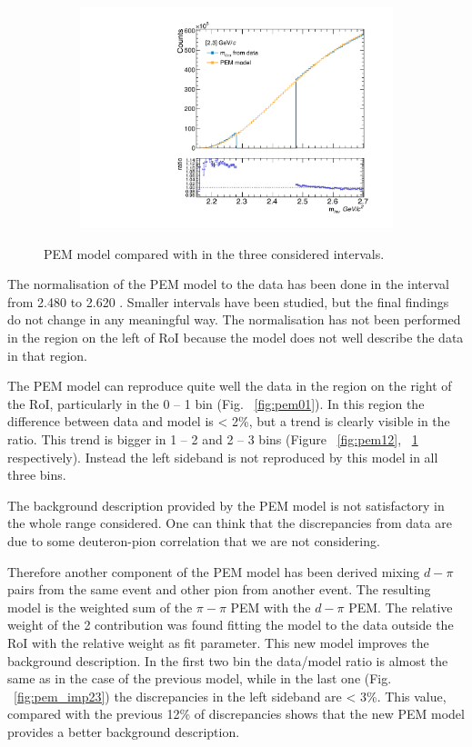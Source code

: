 \begin{figure}
\begin{subfigure}{.33\textwidth}
  \includegraphics[width=\linewidth]{gfx/23}
  \caption{}
  \label{fig:pem23}
\end{subfigure}
\caption{PEM model compared with \minv in the three considered \pt intervals.}
\label{fig:PEM}
\end{figure}

The normalisation of the PEM model to the data has been done in the interval from 2.480 to
2.620 \gevcs. Smaller intervals have been studied, but the final findings do not
change in any meaningful way. The normalisation has not been performed in the region on the left 
of RoI because the model does not well describe the data in that region.

The PEM model can reproduce quite well the data in the region on the right of the RoI,
particularly in the 0 -- 1 \gevc \pt bin (Fig. ~\ref{fig:pem01}). In this region the difference between
data and model is < 2\%, but a trend is clearly visible in the ratio.
This trend is bigger in 1 -- 2 \gevc and 2 -- 3 \gevc \pt bins (Figure ~\ref{fig:pem12}, 
~\ref{fig:pem23} respectively).
Instead the left sideband is not reproduced by this model in all three \pt bins.

The background description provided by the PEM model is not satisfactory in the whole \pt range
considered. One can think that the discrepancies from data are due to some deuteron-pion correlation
that we are not considering.

Therefore another component of the PEM model has been derived mixing $d-\pi$ pairs from the
same event and other pion from another event.
The resulting model is the weighted sum of the $\pi-\pi$ PEM with the $d-\pi$ PEM. 
The relative weight of the 2 contribution was found fitting the model to the data outside the RoI
with the relative weight as fit parameter.
This new model improves the background description.
In the first two \pt bin the data/model ratio is almost the same as in the case of the previous model,
while in the last one (Fig. ~\ref{fig:pem_imp23}) the discrepancies in the left sideband are < 3\%.
This value, compared with the previous 12\% of discrepancies shows that the new PEM
model provides a better background description.

